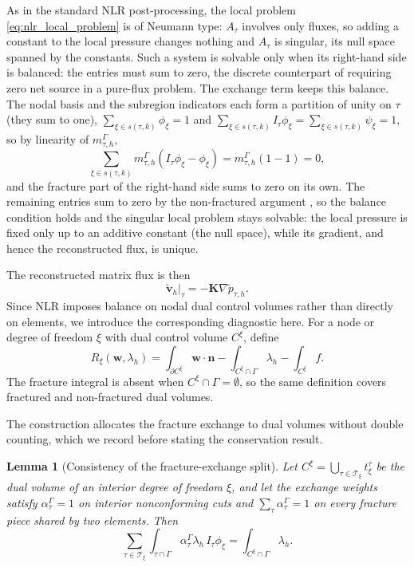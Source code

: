 \documentclass[a4paper,fleqn]{cas-sc}
\newcommand{\Kmat}{\mathbf{K}}
\newcommand{\vflux}{\mathbf{v}}
\newtheorem{lemma}[theorem]{Lemma}
\begin{document}
As in the standard NLR post-processing, the local problem
\eqref{eq:nlr_local_problem} is of Neumann type: \(A_\tau\) involves only fluxes,
so adding a constant to the local pressure changes nothing and \(A_\tau\) is
singular, its null space spanned by the constants. Such a system is solvable only
when its right-hand side is balanced: the entries must sum to zero, the discrete
counterpart of requiring zero net source in a pure-flux problem. The exchange
term keeps this balance. The nodal basis and the subregion indicators each form a
partition of unity on \(\tau\) (they sum to one),
\(\sum_{\xi\in s(\tau,k)}\phi_\xi=1\) and
\(\sum_{\xi\in s(\tau,k)}I_\tau\phi_\xi=\sum_{\xi\in s(\tau,k)}\psi_\xi=1\), so by
linearity of \(m_{\tau,h}^\Gamma\),
\[
\sum_{\xi\in s(\tau,k)}
m_{\tau,h}^\Gamma(I_\tau\phi_\xi-\phi_\xi)
=
m_{\tau,h}^\Gamma(1-1)=0,
\]
and the fracture part of the right-hand side sums to zero on its own. The
remaining entries sum to zero by the non-fractured argument
\citep[Lemma~3.1]{DENG2019166}, so the balance condition holds and the singular
local problem stays solvable: the local pressure is fixed only up to an additive
constant (the null space), while its gradient, and hence the reconstructed
flux, is unique.

The reconstructed matrix flux is then
\begin{equation}
  \widetilde{\vflux}_h|_\tau
  =
  -\Kmat\nabla\widetilde p_{\tau,h}.
  \label{eq:nlr_reconstructed_flux}
\end{equation}
Since NLR imposes balance on nodal dual control volumes rather than directly
on elements, we introduce the corresponding diagnostic here. For a node or
degree of freedom \(\xi\) with dual control volume \(C^\xi\), define
\begin{equation}
R_\xi(\mathbf{w},\lambda_h)
=
\int_{\partial C^\xi}\mathbf{w}\cdot\mathbf{n}
-
\int_{C^\xi\cap\Gamma}\lambda_h
-
\int_{C^\xi} f .
\label{eq:dual_residual}
\end{equation}
The fracture integral is absent when \(C^\xi\cap\Gamma=\emptyset\), so the same
definition covers fractured and non-fractured dual volumes.

The construction allocates the fracture exchange to dual volumes without double
counting, which we record before stating the conservation result.

\begin{lemma}[Consistency of the fracture-exchange split]
\label{lem:exchange-consistency}
Let \(C^\xi=\bigcup_{\tau\in\mathcal{T}_\xi}t_\xi^\tau\) be the dual volume of an
interior degree of freedom \(\xi\), and let the exchange weights satisfy
\(\alpha_\tau^\Gamma=1\) on interior nonconforming cuts and
\(\sum_{\tau}\alpha_\tau^\Gamma=1\) on every fracture piece shared by two
elements. Then
\[
\sum_{\tau\in\mathcal{T}_\xi}
\int_{\tau\cap\Gamma}
\alpha_\tau^\Gamma\lambda_h\,I_\tau\phi_\xi
=
\int_{C^\xi\cap\Gamma}\lambda_h .
\]
\end{lemma}
\end{document}
